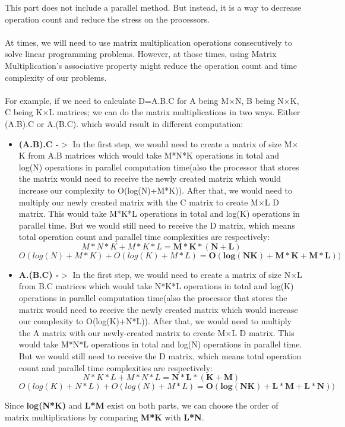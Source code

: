 This part does not include a parallel method. But instead, it is a way to decrease operation count and reduce the stress on the processors.\\ 
\\
At times, we will need to use matrix multiplication operations consecutively to solve linear programming problems. However, at those times, using Matrix Multiplication's associative property might reduce the operation count and time complexity of our problems.\\
\\
For example, if we need to calculate D=A.B.C for A being M$\times$N, B being N$\times$K, C being K$\times$L matrices;
we can do the matrix multiplications in two ways. Either (A.B).C or A.(B.C). which would result in different computation:
\begin{itemize}
	\item \textbf{(A.B).C -$>$} In the first step, we would need to create a matrix of size M$\times$K from A.B matrices which would take M*N*K operations in total and log(N) operations in parallel computation time(also the processor that stores the matrix would need to receive the newly created matrix which would increase our complexity to O(log(N)+M*K)). After that, we would need to multiply our newly created matrix with the C matrix to create M$\times$L D matrix. This would take  M*K*L operations in total and log(K) operations in parallel time. But we would still need to receive the D matrix, which means total operation count and parallel time complexities are respectively:
	\[M*N*K+M*K*L = \mathbf{M*K*(N+L)}\]
	\[O(log(N)+M*K) + O(log(K)+M*L) = \mathbf{O(log(NK)+M*K+M*L))}\]
	\item \textbf{A.(B.C) -$>$} In the first step, we would need to create a matrix of size N$\times$L from B.C matrices which would take N*K*L operations in total and log(K) operations in parallel computation time(also the processor that stores the matrix would need to receive the newly created matrix which would increase our complexity to O(log(K)+N*L)). After that, we would need to multiply the A matrix with our newly-created matrix to create M$\times$L D matrix. This would take  M*N*L operations in total and log(N) operations in parallel time. But we would still need to receive the D matrix, which means total operation count and parallel time complexities are respectively:
	\[N*K*L+M*N*L = \mathbf{N*L*(K+M)}\]
	\[O(log(K)+N*L) + O(log(N)+M*L) = \mathbf{O(log(NK)+L*M+L*N))}\]
\end{itemize}
Since \textbf{log(N*K)} and \textbf{L*M} exist on both parts, we can choose the order of matrix multiplications by comparing \textbf{M*K} with \textbf{L*N}.
